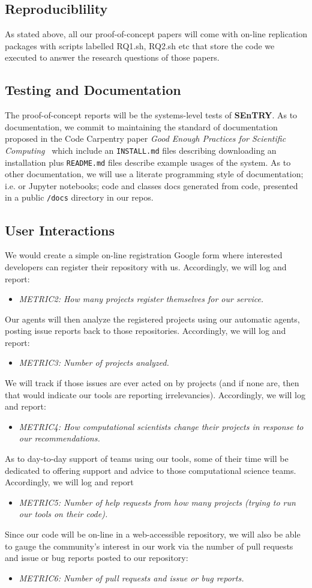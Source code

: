 \documentclass{NSF}
\newenvironment{myitemize}
{ \begin{itemize}
    \setlength{\itemsep}{0pt}
    \setlength{\parskip}{0pt}
    \setlength{\parsep}{0pt}     }
{ \end{itemize}                  }
\newcommand{\bi}{\begin{myitemize}}
\newcommand{\ei}{\end{myitemize}}
\newcommand{\IT}{{\bf {\sffamily SEnTRY}}}
\begin{document}
\begin{nsfdescription}
\subsection{Reproduciblility }
 As stated above,
all our proof-of-concept papers will come with on-line replication packages
with scripts labelled RQ1.sh, RQ2.sh etc that store the code we executed to answer the research questions
of those papers. 


\subsection{Testing and Documentation}
The proof-of-concept reports will be the
systems-level tests of {\IT}.
As to documentation, we   commit to  maintaining  the standard of documentation proposed
in the Code Carpentry  paper {\em Good Enough Practices for Scientific Computing}~\cite{Wilson16} which include an {\tt INSTALL.md} files describing downloading
an installation plus {\tt README.md} files describe example usages of the system.
As to other documentation, we will use a literate  programming style of documentation; i.e.
or Jupyter notebooks;  
 code and classes docs generated  from  code,
presented in a public  {\tt /docs} directory in
our repos.



\subsection{User Interactions} We would create a simple on-line registration Google
form  where interested developers can register their repository with us. Accordingly, we will log and report: 
\bi
\item {\em METRIC2: How many projects register themselves for our service.}
\ei
Our agents will then analyze the 
registered projects using our automatic agents,
posting   issue reports back to those repositories.
Accordingly, we will log and report: 
\bi
\item {\em METRIC3: Number of projects analyzed.}
\ei
We will  track if those issues
are ever acted on by  projects (and if none are, then that would indicate our tools are reporting
irrelevancies). Accordingly, we will log and report: 
\bi
\item {\em METRIC4: How computational scientists change their projects
in response to our recommendations.}
\ei
As to day-to-day support of teams using our tools,
some of  their time will be dedicated
to offering   support and advice to  those computational science teams.
Accordingly, we will log and report
\bi
\item {\em METRIC5: Number of help requests from how many projects (trying to run our tools on their code).}
\ei
Since our code will be on-line in a web-accessible repository, we will also be able
to gauge the community's interest in our work via the number of pull requests and issue
or
bug reports posted to our repository:
\bi
\item {\em METRIC6: Number of pull requests and issue or bug reports.}
\ei

\end{nsfdescription}
\end{document}
